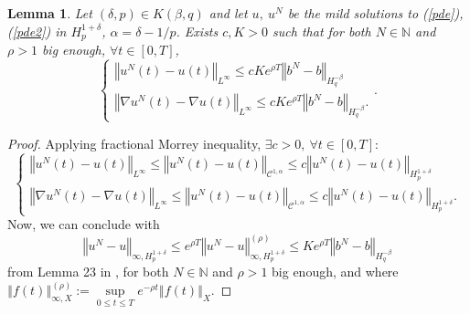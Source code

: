 \documentclass[12pt]{article}
\newtheorem{lem}[theo]{Lemma}
\newcommand{\norme}[1]{\left\Vert #1\right\Vert}
\newcommand{\N}{\mathbb{N}}
\begin{document}
    \begin{lem}\label{morrey} Let $(\delta,p)\in K(\beta,q)$ and let $u,\ u^N$ be the mild solutions to (\ref{pde}),(\ref{pde2}) in $H_p^{1+\delta}$, $\alpha = \delta - 1/p$. Exists $c,K>0$ such that for both $N\in\N$ and $\rho>1$ big enough, $\forall t\in[0,T]$,
        \begin{equation}
        \begin{cases}
        \norme{u^N(t) - u(t)}_{L^\infty}\leq cKe^{\rho T}\norme{b^N-b}_{H^{-\beta}_{q}}\\        
        \norme{\nabla u^N(t) - \nabla u(t)}_{L^\infty}\leq c Ke^{\rho T}\norme{b^N-b}_{H^{-\beta}_{q}}.
        \end{cases} .
        \end{equation}
    \end{lem}    
    
    \begin{proof}
        Applying fractional Morrey inequality, $\exists c>0,\ \forall t\in[0,T]$:
        \begin{equation*}
        \begin{cases}
        \norme{u^N(t) - u(t)}_{L^\infty}\leq\norme{u^N(t) - u(t)}_{\mathcal{C}^{1,\alpha}}\leq c\norme{u^N(t)-u(t)}_{H^{1+\delta}_{p}}\\        
        \norme{\nabla u^N(t) - \nabla u(t)}_{L^\infty}\leq\norme{u^N(t) - u(t)}_{\mathcal{C}^{1,\alpha}}\leq c\norme{u^N(t)-u(t)}_{H^{1+\delta}_{p}}.
        \end{cases}        
        \end{equation*}        
        Now, we can conclude with
        \begin{equation*}
        \norme{u^N-u}_{\infty,H^{1+\delta}_{p}}\leq e^{\rho T} \norme{u^N-u}_{\infty,H^{1+\delta}_{p}}^{(\rho)}\leq Ke^{\rho T}\norme{b^N-b}_{H^{-\beta}_{q}}
        \end{equation*} from Lemma 23 in \cite{Fla-Iss-Rus-2017}, for both $N\in\N$ and $\rho>1$ big enough, and where $\norme{f(t)}_{\infty,X}^{(\rho)} := \underset{0\leq t\leq T}{\sup} e^{-\rho t} \norme{f(t)}_X$.
    \end{proof}
        
\end{document}
